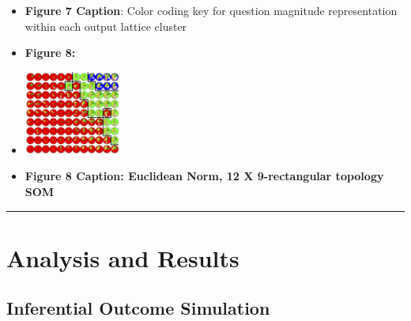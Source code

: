 \documentclass[12pt,]{article}
\begin{document}
\begin{itemize}
\item
  \textbf{Figure 7 Caption}: Color coding key for question magnitude
  representation within each output lattice cluster
\item
  \textbf{Figure 8:}
\item
  \includegraphics[width=0.25\textwidth,height=\textheight]{Som1.jpg}
\item
  \textbf{Figure 8 Caption: Euclidean Norm, 12 X 9-rectangular topology SOM}
\end{itemize}

\begin{center}\rule{0.5\linewidth}{\linethickness}\end{center}

\hypertarget{analysis-and-results}{%
\section{Analysis and Results}\label{analysis-and-results}}

\hypertarget{inferential-outcome-simulation}{%
\subsection{Inferential Outcome
Simulation}\label{inferential-outcome-simulation}}
\end{document}
